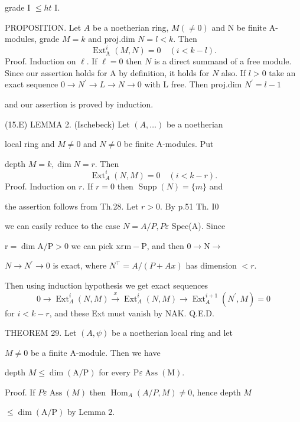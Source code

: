 grade I $\leqslant h t$ I.

PROPOSITION. Let $A$ be a noetherian ring, $M(\neq 0)$ and $\mathrm{N}$ be finite A-modules, grade $M=k$ and proj.dim $N=l<k$. Then
$$
\operatorname{Ext}_{\mathrm{A}}^{i}(M, N)=0 \quad(i<k-l) .
$$
Proof. Induction on $\ell$. If $\ell=0$ then $N$ is a direct summand of a free module. Since our assertion holds for A by definition, it holds for $N$ also. If $l>0$ take an exact sequence $0 \rightarrow N^{\prime} \rightarrow L \rightarrow N \rightarrow 0$ with L free. Then proj.dim $N^{\prime}=l-1$

and our assertion is proved by induction.

(15.E) LEMMA 2. (Ischebeck) Let $(A, \ldots)$ be a noetherian

local ring and $M \neq 0$ and $N \neq 0$ be finite A-modules. Put

depth $M=k, \operatorname{dim} N=r$. Then
$$
\operatorname{Ext}_{A}^{i}(N, M)=0 \quad(i<k-r) .
$$
Proof. Induction on $r$. If $r=0$ then $\operatorname{Supp}(N)=\{m\}$ and

the assertion follows from Th.28. Let $r>0$. By p.51 Th. I0

we can easily reduce to the case $N=A / P, P \varepsilon$ Spec(A). Since

$\mathrm{r}=\operatorname{dim} \mathrm{A} / \mathrm{P}>0$ we can pick $\mathrm{x} \varepsilon \mathrm{m}-\mathrm{P}$, and then $0 \rightarrow \mathrm{N} \rightarrow$

$N \rightarrow N^{\prime} \rightarrow 0$ is exact, where $N^{\top}=A /(P+A x)$ has dimension $<r$.

Then using induction hypothesis we get exact sequences
$$
0 \rightarrow \operatorname{Ext}_{A}^{i}(N, M) \stackrel{x}{\rightarrow} \operatorname{Ext}_{A}^{i}(N, M) \rightarrow \operatorname{Ext}_{A}^{i+1}\left(N^{\prime}, M\right)=0
$$
for $i<k-r$, and these Ext must vanish by NAK. Q.E.D.

THEOREM 29. Let $(A, \psi)$ be a noetherian local ring and let

$M \neq 0$ be a finite A-module. Then we have

depth $M \leqslant \operatorname{dim}(\mathrm{A} / \mathrm{P})$ for every $\mathrm{P} \varepsilon \operatorname{Ass}(\mathrm{M}) .$

Proof. If $P \varepsilon \operatorname{Ass}(M)$ then $\operatorname{Hom}_{A}(A / P, M) \neq 0$, hence depth $M$

$\leqslant \operatorname{dim}(\mathrm{A} / \mathrm{P})$ by Lemma $2 .$


